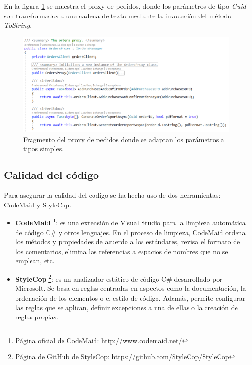 \documentclass[11pt,spanish,listoffigures]{tfgetsinf}
\begin{document}
En la figura \ref{fig:OrdersProxy} se muestra el proxy de pedidos, donde los parámetros de tipo \textit{Guid} son transformados a una cadena de texto mediante la invocación del método \textit{ToString}.

\begin{figure}[h]
\centering
\includegraphics[scale=0.7]{OrdersProxy}
\caption{Fragmento del proxy de pedidos donde se adaptan los parámetros a tipos simples.}
\label{fig:OrdersProxy}
\end{figure}

\subsection{Calidad del código}

Para asegurar la calidad del código se ha hecho uso de dos herramientas: CodeMaid y StyleCop.

\begin{itemize}

\item \textbf{CodeMaid} \footnote{ Página oficial de CodeMaid: \url{http://www.codemaid.net/}}: es una extensión de Visual Studio para la limpieza automática de código C\# y otros lenguajes. En el proceso de limpieza, CodeMaid ordena los métodos y propiedades de acuerdo a los estándares, revisa el formato de los comentarios, elimina las referencias a espacios de nombres que no se emplean, etc.

\item \textbf{StyleCop} \footnote{ Página de GitHub de StyleCop: \url{https://github.com/StyleCop/StyleCop}}: es un analizador estático de código C\# desarrollado por Microsoft. Se basa en reglas centradas en aspectos como la documentación, la ordenación de los elementos o el estilo de código. Además, permite configurar las reglas que se aplican, definir excepciones a una de ellas o la creación de reglas propias.

\end{itemize}
\end{document}
